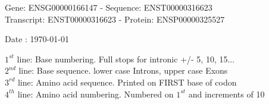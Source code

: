 \documentclass{article}
\begin{document}
\begin{center}
\begin{large}
Gene: ENSG00000166147 - Sequence: ENST00000316623\\
Transcript: ENST00000316623 - Protein: ENSP00000325527
 
 Date : \today
\end{large}
\end{center}
$1^{st}$ line: Base numbering. Full stops for intronic +/- 5, 10, 15...\\
$2^{nd}$ line: Base sequence. lower case Introns, upper case Exons\\
$3^{rd}$ line: Amino acid sequence. Printed on FIRST base of codon\\
$4^{th}$ line: Amino acid numbering. Numbered on $1^{st}$ and increments of 10\\
\end{document}
